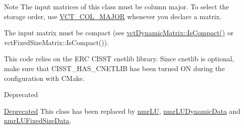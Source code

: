 \begin{DoxyNote}{Note}
The input matrices of this class must be column major. To select the storage order, use \hyperlink{vct_forward_declarations_8h_a432cdf8923afaf82f551450ad4034746}{V\-C\-T\-\_\-\-C\-O\-L\-\_\-\-M\-A\-J\-O\-R} whenever you declare a matrix.

The input matrix must be compact (see \hyperlink{classvct_dynamic_const_matrix_base_ac061c634b765bbd24e2772375c4578a1}{vct\-Dynamic\-Matrix\-::\-Is\-Compact()} or vct\-Fixed\-Size\-Matrix\-::\-Is\-Compact()).

This code relies on the E\-R\-C C\-I\-S\-S\-T cnetlib library. Since cnetlib is optional, make sure that C\-I\-S\-S\-T\-\_\-\-H\-A\-S\-\_\-\-C\-N\-E\-T\-L\-I\-B has been turned O\-N during the configuration with C\-Make.
\end{DoxyNote}
\begin{DoxyRefDesc}{Deprecated}
\item[\hyperlink{deprecated__deprecated000001}{Deprecated}]This class has been replaced by \hyperlink{nmr_l_u_8h_a66bf403c705953a781e940cf1b674d5f}{nmr\-L\-U}, \hyperlink{classnmr_l_u_dynamic_data}{nmr\-L\-U\-Dynamic\-Data} and \hyperlink{classnmr_l_u_fixed_size_data}{nmr\-L\-U\-Fixed\-Size\-Data}. \end{DoxyRefDesc}



